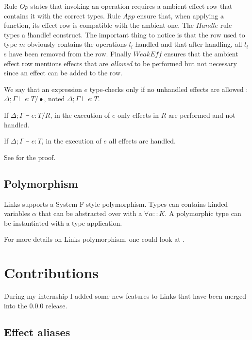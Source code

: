 \documentclass[10pt, nonacm=true, language=french, language=english]{acmart}
\begin{document}
Rule $Op$ states that invoking an operation requires a ambient effect row that contains it with the correct types. Rule $App$ ensure that, when applying a function, its effect row is compatible with the ambient one. The $Handle$ rule types a !handle! construct. The important thing to notice is that the row used to type $m$ obviously contains the operations $l_{i}$ handled and that after handling, all $l_{i}$s have been removed from the row. Finally $WeakEff$ ensures that the ambient effect row mentions effects that are \emph{allowed} to be performed but not necessary since an effect can be added to the row.

We say that an expression $e$ type-checks only if no unhandled effects are allowed : $\Delta;\Gamma \vdash e : T / \bullet$, noted $\Delta;\Gamma \vdash e : T$.


\begin{thm}
  If $\Delta;\Gamma \vdash e : T / R$, in the execution of $e$ only effects in $R$ are performed and not handled.
\end{thm}
\begin{cor}
  If $\Delta;\Gamma \vdash e : T$, in the execution of $e$ all effects are handled.
\end{cor}

See \citep{links-effect} for the proof.


\subsection{Polymorphism}

Links supports a System F \cite{proof-type-girard} style polymorphism. Types can contains kinded variables $\alpha$ that can be abstracted over with a $\forall \alpha :: K$. A polymorphic type can be instantiated with a type application.

For more details on Links polymorphism, one could look at \cite{polymorph-rpc-links}.


\section{Contributions}
\label{sec:contribution}

During my internship I added some new features to Links that have been merged into the 0.0.0 release.

\subsection{Effect aliases}
\end{document}
